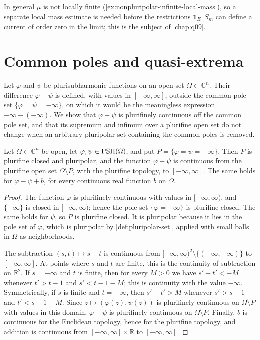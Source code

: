 In general $\mu$ is not locally finite (\cref{ex:nonpluripolar-infinite-local-mass}), so a separate local mass estimate is needed before the restrictions $\mathbf1_{E_m}S_m$ can define a current of order zero in the limit; this is the subject of \cref{chap:q09}.

\section{Common poles and quasi-extrema}
\label{sec:plurifine-quasi-extrema}

Let $\varphi$ and $\psi$ be plurisubharmonic functions on an open set $\Omega\subset\mathbb C^n$. Their difference $\varphi-\psi$ is defined, with values in $[-\infty,\infty]$, outside the common pole set $\{\varphi=\psi=-\infty\}$, on which it would be the meaningless expression $-\infty-(-\infty)$. We show that $\varphi-\psi$ is plurifinely continuous off the common pole set, and that its supremum and infimum over a plurifine open set do not change when an arbitrary pluripolar set containing the common poles is removed.

\begin{proposition}\label{prop:plurifine-difference-continuity}
Let $\Omega\subset\mathbb C^n$ be open, let $\varphi,\psi\in\mathrm{PSH}(\Omega)$, and put $P=\{\varphi=\psi=-\infty\}$. Then $P$ is plurifine closed and pluripolar, and the function $\varphi-\psi$ is continuous from the plurifine open set $\Omega\setminus P$, with the plurifine topology, to $[-\infty,\infty]$. The same holds for $\varphi-\psi+b$, for every continuous real function $b$ on $\Omega$.
\end{proposition}
\begin{proof}
The function $\varphi$ is plurifinely continuous with values in $[-\infty,\infty)$, and $\{-\infty\}$ is closed in $[-\infty,\infty)$; hence the pole set $\{\varphi=-\infty\}$ is plurifine closed. The same holds for $\psi$, so $P$ is plurifine closed. It is pluripolar because it lies in the pole set of $\varphi$, which is pluripolar by \cref{def:pluripolar-set}, applied with small balls in $\Omega$ as neighborhoods.

The subtraction $(s,t)\mapsto s-t$ is continuous from $[-\infty,\infty)^2\setminus\{(-\infty,-\infty)\}$ to $[-\infty,\infty]$. At points where $s$ and $t$ are finite, this is the continuity of subtraction on $\mathbb R^2$. If $s=-\infty$ and $t$ is finite, then for every $M>0$ we have $s'-t'<-M$ whenever $t'>t-1$ and $s'<t-1-M$; this is continuity with the value $-\infty$. Symmetrically, if $s$ is finite and $t=-\infty$, then $s'-t'>M$ whenever $s'>s-1$ and $t'<s-1-M$. Since $z\mapsto(\varphi(z),\psi(z))$ is plurifinely continuous on $\Omega\setminus P$ with values in this domain, $\varphi-\psi$ is plurifinely continuous on $\Omega\setminus P$. Finally, $b$ is continuous for the Euclidean topology, hence for the plurifine topology, and addition is continuous from $[-\infty,\infty]\times\mathbb R$ to $[-\infty,\infty]$.
\end{proof}

